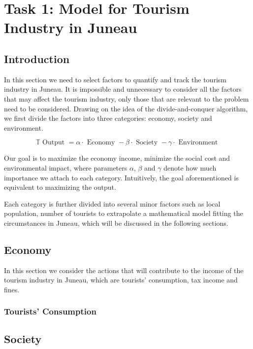 \section{Task 1: Model for Tourism Industry in Juneau}

\subsection{Introduction}


In this section we need to select factors to quantify and track the tourism industry in Juneau. 
It is impossible and unnecessary to consider all the factors that may affect the 
tourism industry, only those that are relevant to the problem need to be considered.
Drawing on the idea of the divide-and-conquer algorithm, we first divide the factors 
into three categories: economy, society and environment. 


\begin{equation}
    \mathbb{T}\text { Output }=\alpha \cdot \text { Economy }-\beta \cdot \text { Society }-\gamma \cdot \text { Environment }
\end{equation}

Our goal is to maximize the economy income, minimize the social cost and environmental impact,
where parameters $\alpha$, $\beta$ and $\gamma$ denote how much importance we attach to each category.
Intuitively, the goal aforementioned is equivalent to maximizing the output.

Each category is further divided into several minor factors such as local population, 
number of tourists to extrapolate a mathematical model fitting the circumstances in Juneau,
which will be discussed in the following sections.





\subsection{Economy}

In this section we consider the actions that will contribute to the income of the tourism industry in Juneau, which are
tourists' consumption, tax income and fines.

\subsubsection{Tourists' Consumption}


\subsection{Society}

